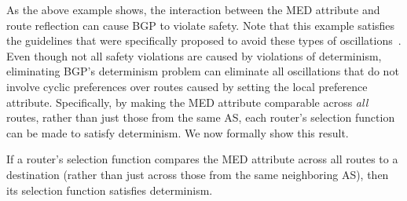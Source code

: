 As the above example shows, the interaction between the MED attribute
and route reflection can cause BGP to violate safety.  Note that this
example satisfies the guidelines that were specifically proposed to
avoid these types of oscillations~\cite{rfc3345}.  Even though not all
safety violations are caused by violations of determinism, eliminating
BGP's determinism problem can eliminate all oscillations that do not
involve cyclic preferences over routes caused by setting the local
preference attribute.  Specifically, by making the MED attribute
comparable across {\em all} routes, rather than just those from the same
AS, each router's selection function can be made to satisfy determinism.
We now formally show this result.

\begin{lemma}\label{lem:det_med}
If a router's selection function compares the MED attribute across all
routes to a destination (rather than just across those from the same
neighboring AS), then its selection function satisfies determinism.
\end{lemma}

